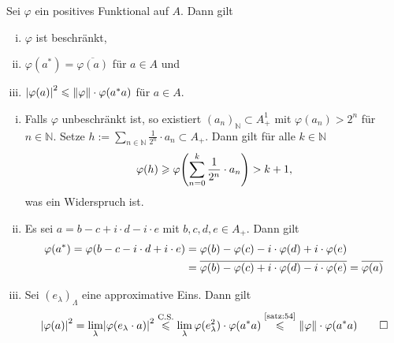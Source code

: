 \begin{satz}[label=satz:53,{name=[Eigenschaften positiver Funktionale]}]
	Sei $\varphi$ ein positives Funktional auf $A$. Dann gilt 
	\begin{enumerate}[(i),itemsep=0pt]
		\item $\varphi$ ist beschränkt,
		\item $\varphi(a^*)=\overline{\varphi(a)}$ für $a \in A$ und
		\item $\abs*{\varphi(a)}^2 \le \norm*{\varphi} \cdot \varphi(a^*a)$ für $a \in A$.
	\end{enumerate}
\end{satz}
\begin{beweis}
	\leavevmode
	\begin{enumerate}[(i)]
		\item Falls $\varphi$ unbeschränkt ist, so existiert $(a_n)_\mathbb{N} \subset A_+^1$ mit $\varphi(a_n) >2^n$ für $n \in \mathbb{N}$.
		Setze $h := \sum_{n \in \mathbb{N}} \frac{1}{2^n} \cdot a_n \subset A_+$.
		Dann gilt für alle $k \in \mathbb{N}$
		\begin{align}
			\varphi(h) \ge \varphi \enbrace*{\sum_{n=0}^{k} \frac{1}{2^n} \cdot a_n} > k+1,
		\end{align}
		was ein Widerspruch ist.
		\item Es sei $a=b-c+ i \cdot d - i \cdot e$ mit $b,c,d,e \in A_+$. Dann gilt
		\begin{align}
			\varphi(a^*) = \varphi \enbrace*{b-c- i \cdot d + i \cdot e} &= \varphi(b) - \varphi(c) - i \cdot \varphi(d) + i \cdot \varphi(e) \\
			&= \overline{\varphi(b) - \varphi(c) + i \cdot \varphi(d) - i \cdot \varphi(e)} = \overline{\varphi(a)}
		\end{align}
		\item Sei $(e_\lambda)_\Lambda$ eine approximative Eins. Dann gilt 
		\[
			\abs*{\varphi(a)}^2 = \lim_\lambda \abs*{\varphi(e_\lambda \cdot a)}^2  \StackText{C.S.}{\le}\lim_\lambda \varphi(e_\lambda^2) \cdot \varphi(a^*a) \StackText{\ref{satz:54}}{\le} \norm*{\varphi} \cdot \varphi(a^*a) \qedhere
		\]
	\end{enumerate}
\end{beweis}

